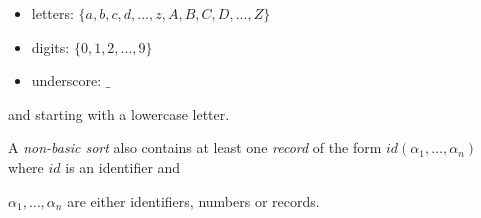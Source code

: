 \documentclass[12pt, letterpaper]{article}
\begin{document}
\begin{itemize}

 \item letters: $\{a,b,c,d,...,z,A,B,C,D,...,Z\}$

 \item digits: $\{0,1,2,...,9\}$

 \item underscore: $\_$

\end{itemize}

and starting with a lowercase letter.



A \textit{non-basic sort} also contains at least one \textit{record} of the form $id(\alpha_1,\dots, \alpha_n)$ where $id$ is an identifier and 

$\alpha_1, \dots, \alpha_n$ are either identifiers, numbers or records. 
\end{document}

